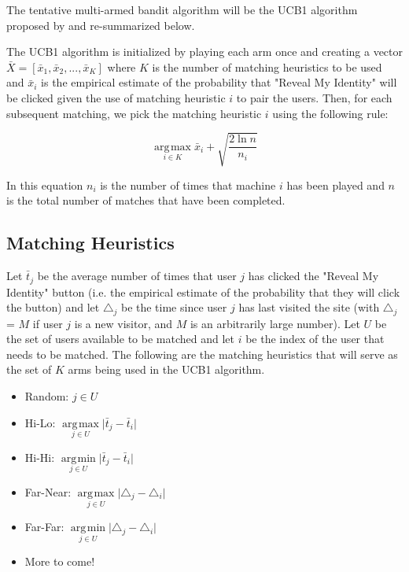 \documentclass{article}
\DeclareMathOperator*{\argmin}{\arg\!\min}
\DeclareMathOperator*{\argmax}{\arg\!\max}
\begin{document}
The tentative multi-armed bandit algorithm will be the UCB1 algorithm proposed by \citep{auer02} and re-summarized below.

The UCB1 algorithm is initialized by playing each arm once and creating a vector $\bar{X} = [\bar{x}_1, \bar{x}_2, ..., \bar{x}_K]$ where $K$ is the number of matching heuristics to be used and 
$\bar{x}_i$ is the empirical estimate of the probability that "Reveal My Identity" will be clicked given the use of matching heuristic $i$ to pair the users. Then, for each subsequent matching, we pick the matching heuristic $i$ using the following rule: 

$$ \underset{i \in{K}}{\argmax{}} \bar{x}_i + \sqrt{\frac{2\ln{n}}{n_i}}$$

In this equation $n_i$ is the number of times that machine $i$ has been played and $n$ is the total number of matches that have been completed.

\subsection{Matching Heuristics}

Let $\bar{t}_j$ be the average number of times that user $j$ has clicked the "Reveal My Identity" button (i.e. the empirical estimate of the probability that they will click the button) and let $\triangle_j$ be the time since user $j$ has last visited the site (with $\triangle_j$ = $M$ if user $j$ is a new visitor, and $M$ is an arbitrarily large number). Let $U$ be the set of users available to be matched and let $i$ be the index of the user that needs to be matched. The following are the matching heuristics that will serve as the set of $K$ arms being used in the UCB1 algorithm.

\begin{itemize}
  \item Random: $ j \in{U} $
  \item Hi-Lo: $\underset{j \in{U}}{\argmax} \lvert{\bar{t}_j - \bar{t}_i}\rvert\ $
  \item Hi-Hi: $\underset{j \in{U}}{\argmin} \lvert{\bar{t}_j - \bar{t}_i}\rvert\ $
  \item Far-Near: $\underset{j \in{U}}{\argmax} \lvert{\triangle_j - \triangle_i}\rvert\ $
  \item Far-Far: $\underset{j \in{U}}{\argmin} \lvert{\triangle_j - \triangle_i}\rvert\ $
  \item More to come!
\end{itemize}
\end{document}
